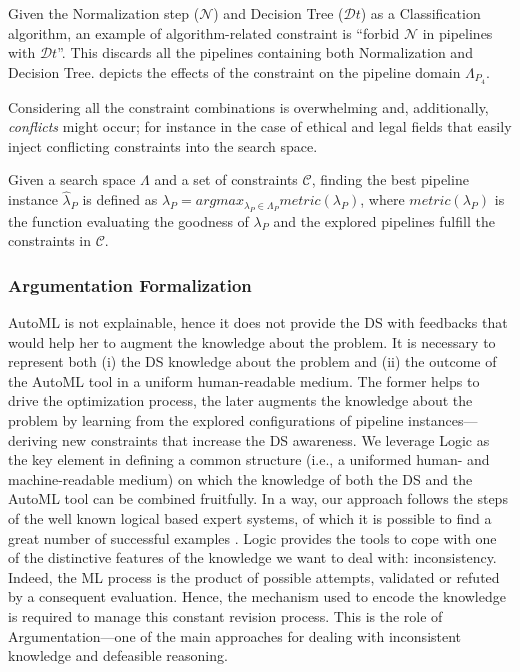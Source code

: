 \begin{example}[Constraint]
Given the Normalization step ($\mathcal{N}$) and Decision Tree ($\mathcal{D}t$) as a Classification algorithm, an example of algorithm-related constraint is ``forbid $\mathcal{N}$ in pipelines with $\mathcal{D}t$''.
This discards all the pipelines containing both Normalization and Decision Tree.
 depicts the effects of the constraint on the pipeline domain $\Lambda_{P_4}$.
\label{ex:constraints}
\end{example}

Considering all the constraint combinations is overwhelming and, additionally, \emph{conflicts} might occur; for instance in the case of ethical \cite{boston-house} and legal fields that easily inject conflicting constraints into the search space.

\begin{definition}
Given a search space $\Lambda$ and a set of constraints $\mathcal{C}$, finding the best pipeline instance $\hat{\lambda}_P$ is defined as $\hat{\lambda}_P = argmax_{\lambda_P \in \Lambda_P} metric(\lambda_P)$, where $metric(\lambda_P)$ is the function evaluating the goodness of $\lambda_P$ and the explored pipelines fulfill the constraints in $\mathcal{C}$.
\end{definition}

\subsubsection{Argumentation Formalization}

AutoML is not explainable, hence it does not provide the DS with feedbacks that would help her to augment the knowledge about the problem.
It is necessary to represent both (i) the DS knowledge about the problem and (ii) the outcome of the AutoML tool in a uniform human-readable medium.
The former helps to drive the optimization process,
the later augments the knowledge about the problem by learning from the explored configurations of pipeline instances---deriving new constraints that increase the DS awareness.
We leverage Logic as the key element in defining a common structure (i.e., a uniformed human- and machine-readable medium) on which the knowledge of both the DS and the AutoML tool can be combined fruitfully.
In a way, our approach follows the steps of the well known logical based expert systems, of which it is possible to find a great number of successful examples \cite{tan17es}.
Logic provides the tools to cope with one of the distinctive features of the knowledge we want to deal with: inconsistency. Indeed, the ML process is the product of possible attempts, validated or refuted by a consequent evaluation. Hence, the mechanism used to encode the knowledge is required to manage this constant revision process.
This is the role of Argumentation---one of the main approaches for dealing with inconsistent knowledge and defeasible reasoning. 

